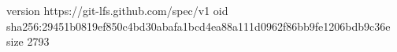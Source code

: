 version https://git-lfs.github.com/spec/v1
oid sha256:29451b0819ef850c4bd30abafa1bcd4ea88a111d0962f86bb9fe1206bdb9c36e
size 2793
